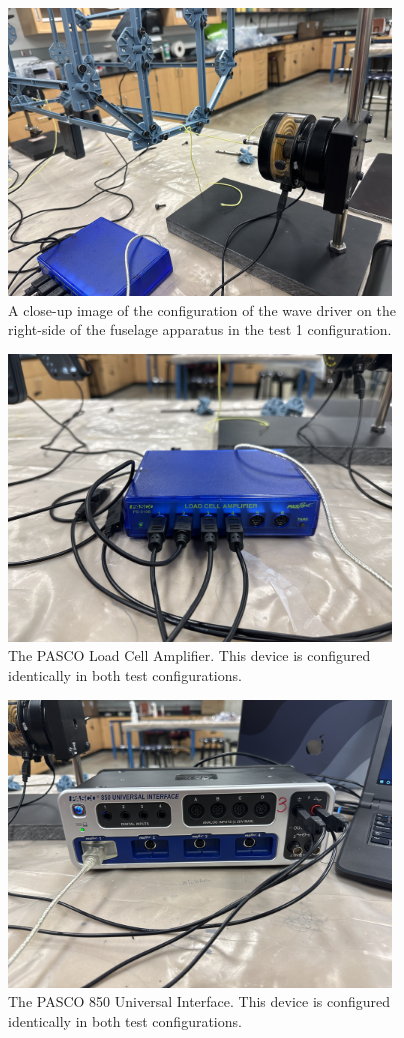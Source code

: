 \documentclass[12 pt]{report}
\begin{document}
\begin{figure}[htbp]
	\centering
	\includegraphics[width=4in]{images/IMG_1316}
	\caption{A close-up image of the configuration of the wave driver on the right-side of the fuselage apparatus in the test \num{1} configuration.}
	\label{fig:test1_app_5}
\end{figure}

\begin{figure}[htbp]
	\centering
	\includegraphics[width=4in]{images/IMG_1317}
	\caption{The PASCO Load Cell Amplifier. This device is configured identically in both test configurations.}
	\label{fig:test1_app_6}
\end{figure}

\begin{figure}[htbp]
	\centering
	\includegraphics[width=4in]{images/IMG_1318}
	\caption{The PASCO 850 Universal Interface. This device is configured identically in both test configurations.}
	\label{fig:test1_app_7}
\end{figure}
\end{document}
